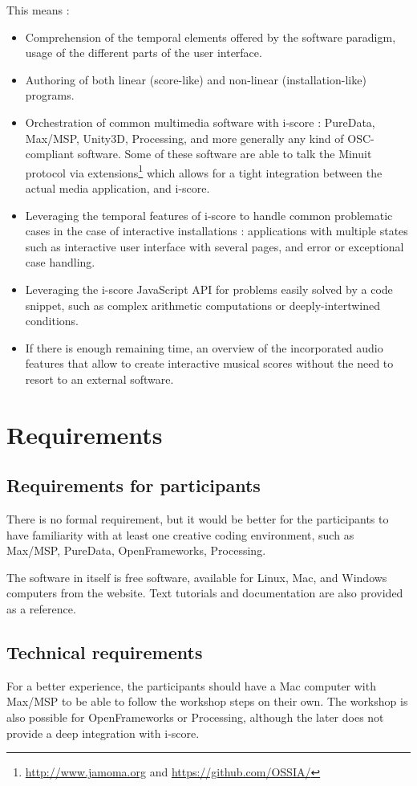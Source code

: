 \documentclass[11pt]{article}
\begin{document}
This means : 
\begin{itemize}
	\item Comprehension of the temporal elements offered by the software paradigm, usage of the different parts of the user interface.
	\item Authoring of both linear (score-like) and non-linear (installation-like) programs.
	\item Orchestration of common multimedia software with i-score : PureData, Max/MSP, Unity3D, Processing, and more generally any kind of OSC-compliant software.
	Some of these software are able to talk the Minuit protocol via extensions\footnote{\url{http://www.jamoma.org} and \url{https://github.com/OSSIA/}} which allows for a tight integration between the actual media application, and i-score.
	\item Leveraging the temporal features of i-score to handle common problematic cases in the case of interactive installations : applications with multiple states such as interactive user interface with several pages, and error or exceptional case handling.
	\item Leveraging the i-score JavaScript API for problems easily solved by a code snippet, such as complex arithmetic computations or deeply-intertwined conditions.
	\item If there is enough remaining time, an overview of the incorporated audio features that allow to create interactive musical scores without the need to resort to an external software.
\end{itemize}

\section*{Requirements}
\subsection*{Requirements for participants}
There is no formal requirement, but it would be better for the 
participants to have familiarity with at least one creative coding environment, 
such as Max/MSP, PureData, OpenFrameworks, Processing.

The software in itself is free software, available for Linux, Mac, and Windows computers from the website.
Text tutorials and documentation are also provided as a reference.

\subsection*{Technical requirements}
For a better experience, the participants should have a Mac computer with Max/MSP to be able to follow the workshop steps on their own. The workshop is also possible for OpenFrameworks or Processing, although the later does not provide a deep integration with i-score.
\end{document}
